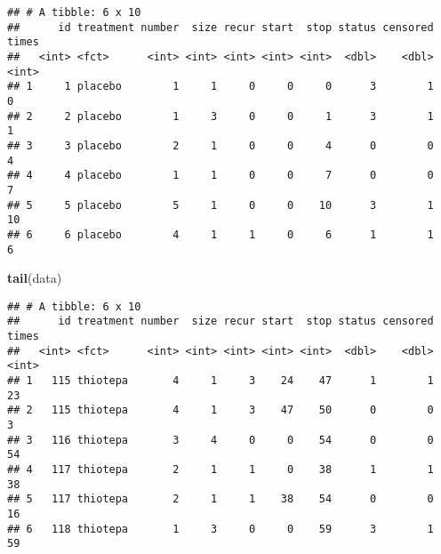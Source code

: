 \documentclass[]{article}
\newenvironment{Shaded}{\begin{snugshade}}{\end{snugshade}}
\newcommand{\ControlFlowTok}[1]{\textcolor[rgb]{0.13,0.29,0.53}{\textbf{#1}}}
\newcommand{\DataTypeTok}[1]{\textcolor[rgb]{0.13,0.29,0.53}{#1}}
\newcommand{\DecValTok}[1]{\textcolor[rgb]{0.00,0.00,0.81}{#1}}
\newcommand{\KeywordTok}[1]{\textcolor[rgb]{0.13,0.29,0.53}{\textbf{#1}}}
\newcommand{\NormalTok}[1]{#1}
\newcommand{\OperatorTok}[1]{\textcolor[rgb]{0.81,0.36,0.00}{\textbf{#1}}}
\newcommand{\StringTok}[1]{\textcolor[rgb]{0.31,0.60,0.02}{#1}}
\begin{document}
\begin{Shaded}
\end{Shaded}

\begin{verbatim}
## # A tibble: 6 x 10
##      id treatment number  size recur start  stop status censored times
##   <int> <fct>      <int> <int> <int> <int> <int>  <dbl>    <dbl> <int>
## 1     1 placebo        1     1     0     0     0      3        1     0
## 2     2 placebo        1     3     0     0     1      3        1     1
## 3     3 placebo        2     1     0     0     4      0        0     4
## 4     4 placebo        1     1     0     0     7      0        0     7
## 5     5 placebo        5     1     0     0    10      3        1    10
## 6     6 placebo        4     1     1     0     6      1        1     6
\end{verbatim}

\begin{Shaded}
\begin{Highlighting}[]
\KeywordTok{tail}\NormalTok{(data)}
\end{Highlighting}
\end{Shaded}

\begin{verbatim}
## # A tibble: 6 x 10
##      id treatment number  size recur start  stop status censored times
##   <int> <fct>      <int> <int> <int> <int> <int>  <dbl>    <dbl> <int>
## 1   115 thiotepa       4     1     3    24    47      1        1    23
## 2   115 thiotepa       4     1     3    47    50      0        0     3
## 3   116 thiotepa       3     4     0     0    54      0        0    54
## 4   117 thiotepa       2     1     1     0    38      1        1    38
## 5   117 thiotepa       2     1     1    38    54      0        0    16
## 6   118 thiotepa       1     3     0     0    59      3        1    59
\end{verbatim}
\end{document}
